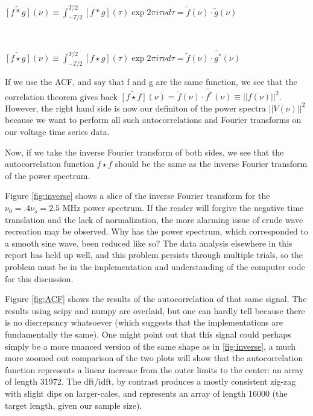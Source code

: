 \documentclass[a4paper]{article}
\begin{document}
$\widetilde{[f * g]}(\nu) \equiv \int_{-T / 2}^{T / 2}[f * g](\tau) \exp{2 \pi i \tau \nu} d \tau = \tilde{f}(\nu) \cdot \tilde{g}(\nu)$

\

$\widetilde{[f \star g]}(\nu) \equiv \int_{-T / 2}^{T / 2}[f \star g](\tau) \exp{2 \pi i \tau \nu} d \tau = \tilde{f}(\nu) \cdot \tilde{g^*}(\nu)$

If we use the ACF, and say that f and g are the same function, we see that the correlation theorem gives back $\widetilde{[f \star f]}(\nu) = \tilde{f}(\nu) \cdot \tilde{f^*}(\nu) \equiv ||f(\nu)||^2$. However, the right hand side is now our definiton of the power spectra $||V(\nu)||^2$ because we want to perform all such autocorrelations and Fourier transforms on our voltage time series data.

Now, if we take the inverse Fourier transform of both sides, we see that the autocorrelation function $f \star f$ should be the same as the inverse Fourier transform of the power spectrum.

Figure \ref{fig:inverse} shows a slice of the inverse Fourier transform for the $\nu_0 = .4 \nu_s = 2.5$ MHz power spectrum. If the reader will forgive the negative time translation and the lack of normalization, the more alarming issue of crude wave recreation may be observed. Why has the power spectrum, which corresponded to a smooth sine wave, been reduced like so? The data analysis elsewhere in this report has held up well, and this problem persists through multiple trials, so the problem must be in the implementation and understanding of the computer code for this discussion.

Figure \ref{fig:ACF} shows the results of the autocorrelation of that same signal. The results using scipy and numpy are overlaid, but one can hardly tell because there is no discrepancy whatsoever (which suggests that the implementations are fundamentally the same). One might point out that this signal could perhaps simply be a more nuanced version of the same shape as in \ref{fig:inverse}, a much more zoomed out comparison of the two plots will show that the autocorrelation function represents a linear increase from the outer limits to the center: an array of length 31972. The dft/idft, by contrast produces a mostly consistent zig-zag with slight dips on larger-cales, and represents an array of length 16000 (the target length, given our sample size).

\end{document}
